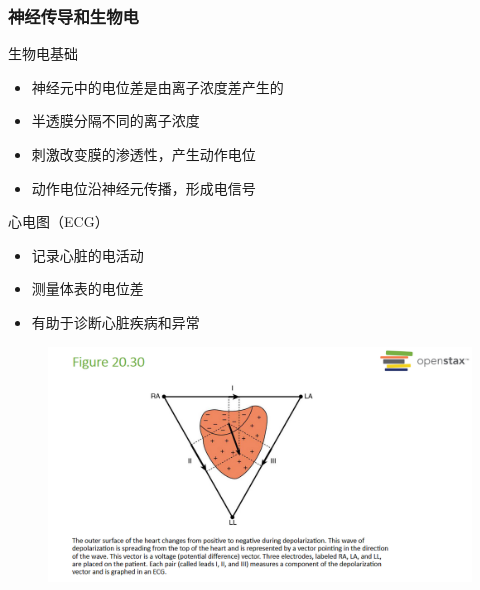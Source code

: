 \documentclass{beamer}
\begin{document}
\begin{frame}
    \frametitle{神经传导和生物电}
    \begin{block}{生物电基础}
        \begin{itemize}
            \item 神经元中的电位差是由离子浓度差产生的
            \item 半透膜分隔不同的离子浓度
            \item 刺激改变膜的渗透性，产生动作电位
            \item 动作电位沿神经元传播，形成电信号
        \end{itemize}
    \end{block}
    \begin{block}{心电图（ECG）}
        \begin{itemize}
            \item 记录心脏的电活动
            \item 测量体表的电位差
            \item 有助于诊断心脏疾病和异常
        \end{itemize}
    \end{block}
\end{frame}
\begin{frame}{}
    \begin{figure}
        \centering
        \includegraphics[width=1\linewidth]{ecg.png}
    \end{figure}
\end{frame}

\end{document}
